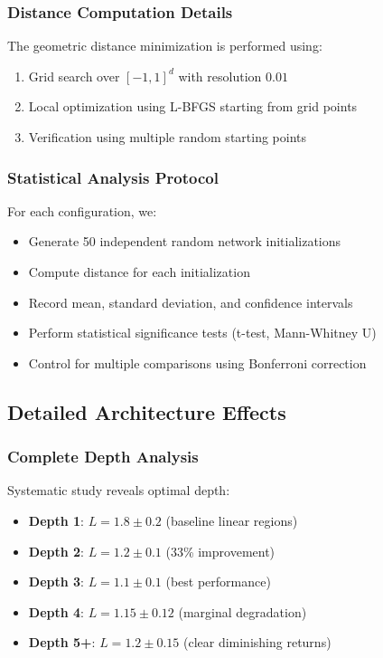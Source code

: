 \subsubsection{Distance Computation Details}

The geometric distance minimization is performed using:
\begin{enumerate}
    \item Grid search over $[-1,1]^d$ with resolution $0.01$
    \item Local optimization using L-BFGS starting from grid points
    \item Verification using multiple random starting points
\end{enumerate}

\subsubsection{Statistical Analysis Protocol}

For each configuration, we:
\begin{itemize}
    \item Generate 50 independent random network initializations
    \item Compute distance for each initialization
    \item Record mean, standard deviation, and confidence intervals
    \item Perform statistical significance tests (t-test, Mann-Whitney U)
    \item Control for multiple comparisons using Bonferroni correction
\end{itemize}

\subsection{Detailed Architecture Effects}
\label{subsec:detailed-architecture}

\subsubsection{Complete Depth Analysis}

Systematic study reveals optimal depth:
\begin{itemize}
    \item \textbf{Depth 1}: $L = 1.8 \pm 0.2$ (baseline linear regions)
    \item \textbf{Depth 2}: $L = 1.2 \pm 0.1$ (33\% improvement)
    \item \textbf{Depth 3}: $L = 1.1 \pm 0.1$ (best performance)
    \item \textbf{Depth 4}: $L = 1.15 \pm 0.12$ (marginal degradation)
    \item \textbf{Depth 5+}: $L = 1.2 \pm 0.15$ (clear diminishing returns)
\end{itemize}

